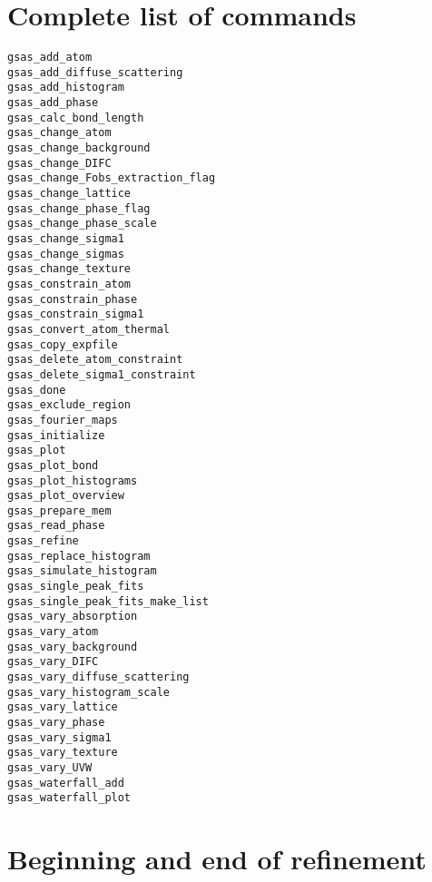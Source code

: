 \section{Complete list of commands}

\begin{verbatim}
gsas_add_atom
gsas_add_diffuse_scattering
gsas_add_histogram
gsas_add_phase
gsas_calc_bond_length
gsas_change_atom
gsas_change_background
gsas_change_DIFC
gsas_change_Fobs_extraction_flag
gsas_change_lattice
gsas_change_phase_flag
gsas_change_phase_scale
gsas_change_sigma1
gsas_change_sigmas
gsas_change_texture
gsas_constrain_atom
gsas_constrain_phase
gsas_constrain_sigma1
gsas_convert_atom_thermal
gsas_copy_expfile
gsas_delete_atom_constraint
gsas_delete_sigma1_constraint
gsas_done
gsas_exclude_region
gsas_fourier_maps
gsas_initialize
gsas_plot
gsas_plot_bond
gsas_plot_histograms
gsas_plot_overview
gsas_prepare_mem
gsas_read_phase
gsas_refine
gsas_replace_histogram
gsas_simulate_histogram
gsas_single_peak_fits
gsas_single_peak_fits_make_list
gsas_vary_absorption
gsas_vary_atom
gsas_vary_background
gsas_vary_DIFC
gsas_vary_diffuse_scattering
gsas_vary_histogram_scale
gsas_vary_lattice
gsas_vary_phase
gsas_vary_sigma1
gsas_vary_texture
gsas_vary_UVW
gsas_waterfall_add
gsas_waterfall_plot
\end{verbatim}

%

\section{Beginning and end of refinement}

